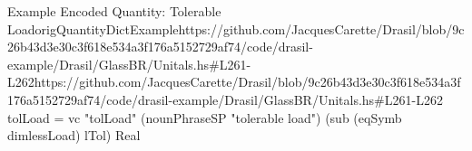 \begin{haskell}{Example Encoded Quantity: Tolerable Load}{origQuantityDictExample}{https://github.com/JacquesCarette/Drasil/blob/9c26b43d3e30c3f618e534a3f176a5152729a\newline{}f74/code/drasil-example/Drasil/GlassBR/Unitals.hs\#L261-L262}{https://github.com/JacquesCarette/Drasil/blob/9c26b43d3e30c3f618e534a3f176a5152729af74/code/drasil-example/Drasil/GlassBR/Unitals.hs\#L261-L262}
tolLoad = vc "tolLoad" (nounPhraseSP "tolerable load")
    (sub (eqSymb dimlessLoad) lTol) Real
\end{haskell}
